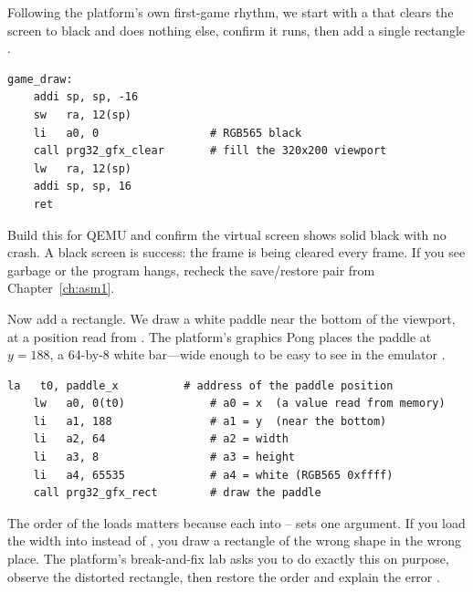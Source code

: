 Following the platform's own first-game rhythm, we start with a  that
clears the screen to black and does nothing else, confirm it runs, then add a
single rectangle \citep{prg32tutorialgraphic}.

\begin{lstlisting}[style=asm,caption={A \code{draw} that clears the frame. Build this first and confirm a black screen before drawing anything on it.}]
game_draw:
    addi sp, sp, -16
    sw   ra, 12(sp)
    li   a0, 0                 # RGB565 black
    call prg32_gfx_clear       # fill the 320x200 viewport
    lw   ra, 12(sp)
    addi sp, sp, 16
    ret
\end{lstlisting}

\begin{prgcheck}
Build this for QEMU and confirm the virtual screen shows solid black with no
crash. A black screen is success: the frame is being cleared every frame. If you
see garbage or the program hangs, recheck the  save/restore pair from
Chapter~\ref{ch:asm1}.
\end{prgcheck}

Now add a rectangle. We draw a white paddle near the bottom of the viewport, at
a position read from . The platform's graphics Pong places the paddle
at $y=188$, a 64-by-8 white bar---wide enough to be easy to see in the emulator
\citep{prg32repo}.

\begin{lstlisting}[style=asm,caption={Drawing the paddle from a stored position. The five arguments fill \reg{a0}--\reg{a4} in order.}]
    la   t0, paddle_x          # address of the paddle position
    lw   a0, 0(t0)             # a0 = x  (a value read from memory)
    li   a1, 188               # a1 = y  (near the bottom)
    li   a2, 64                # a2 = width
    li   a3, 8                 # a3 = height
    li   a4, 65535             # a4 = white (RGB565 0xffff)
    call prg32_gfx_rect        # draw the paddle
\end{lstlisting}

\begin{prgwarn}
The order of the loads matters because each  into --
sets one argument. If you load the width into  instead of , you
draw a rectangle of the wrong shape in the wrong place. The platform's
break-and-fix lab asks you to do exactly this on purpose, observe the distorted
rectangle, then restore the order and explain the error
\citep{prg32tutorialgraphic}.
\end{prgwarn}

